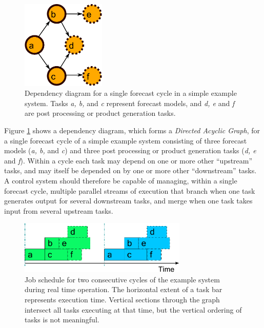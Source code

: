 \documentclass[11pt,a4paper]{article}
\begin{document}
\begin{figure} 
    \begin{center}
    \includegraphics[width=4cm]{dependencies-one} 
    \end{center}
    \caption{\small Dependency diagram for a single forecast cycle in a
    simple example system. Tasks {\em a, b,} and {\em c} represent
    forecast models, and {\em d, e} and {\em f} are post processing or
    product generation tasks.} 
    \label{fig-dep-one} 
\end{figure} 

Figure \ref{fig-dep-one} shows a dependency diagram, which forms a {\em
Directed Acyclic Graph}, for a single forecast cycle of a simple example
system consisting of three forecast models ({\em a, b,} and {\em c}) and
three post processing or product generation tasks ({\em d, e} and {\em
f}).  Within a cycle each task may depend on one or more other
``upstream'' tasks, and may itself be depended on by one or more other
``downstream'' tasks.  A control system should therefore be capable of
managing, within a single forecast cycle, multiple parallel streams of
execution that branch when one task generates output for several
downstream tasks, and merge when one task takes input from several
upstream tasks. 

\begin{figure}
    \begin{center}
        \includegraphics[width=8cm]{timeline-one}
    \end{center}
    \caption{\small Job schedule for two consecutive cycles of the
    example system during real time operation. The horizontal extent of
    a task bar represents execution time. Vertical sections through the
    graph intersect all tasks executing at that time, but the vertical
    ordering of tasks is not meaningful.}
    \label{fig-time-one}
\end{figure}
\end{document}
